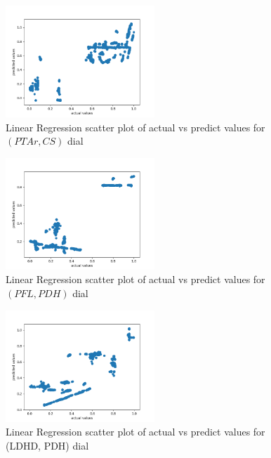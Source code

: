 \documentclass[12pt,chapterheads]{ucsd}
\begin{document}
\begin{figure}[h] 
\centering
\includegraphics[width=0.5\textwidth]{Figures/PTAr_CS_lr}
\caption[Linear Regression scatter plot of actual vs predict values for $(PTAr, CS)$ dial]
{Linear Regression scatter plot of actual vs predict values for $(PTAr, CS)$ dial}
\label{fig:PtarCsLr}
\end{figure}

\begin{figure}[h] 
\centering
\includegraphics[width=0.5\textwidth]{Figures/PFL_PDH_lr}
\caption[Linear Regression scatter plot of actual vs predict values for $(PFL, PDH)$ dial]
{Linear Regression scatter plot of actual vs predict values for $(PFL, PDH)$ dial}
\label{fig:PflPdhLr}
\end{figure}

\begin{figure}[h] 
\centering
\includegraphics[width=0.5\textwidth]{Figures/LDH_D_PDH_lr}
\caption[Linear Regression scatter plot of actual vs predict values for \string(LDH\textunderscore D, PDH) dial]
{Linear Regression scatter plot of actual vs predict values for \string(LDH\textunderscore D, PDH) dial}
\label{fig:LdhPdhLr}
\end{figure}
\end{document}
